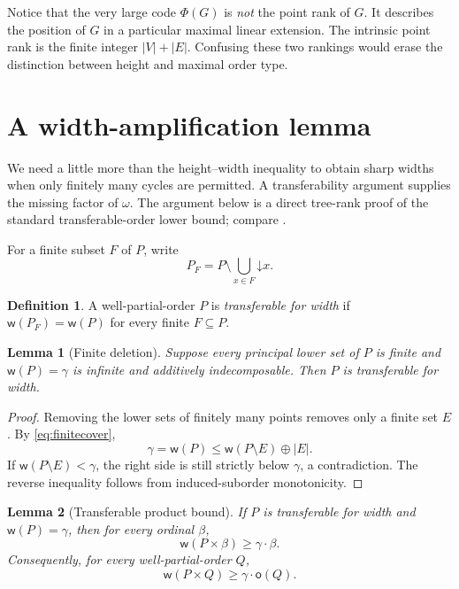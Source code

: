 \documentclass[11pt,letterpaper]{article}
\theoremstyle{plain}
\newtheorem{lemma}[lemma]{Lemma}
\theoremstyle{definition}
\newtheorem{definition}[definition]{Definition}
\theoremstyle{remark}
\newcommand{\mot}{\mathsf o}
\newcommand{\wid}{\mathsf w}
\newcommand{\down}{\mathord\downarrow}
\begin{document}
Notice that the very large code $\Phi(G)$ is \emph{not} the point rank
of $G$. It describes the position of $G$ in a particular maximal
linear extension. The intrinsic point rank is the finite integer
$|V|+|E|$. Confusing these two rankings would erase the distinction
between height and maximal order type.

\section{A width-amplification lemma}\label{sec:transfer}

We need a little more than the height--width inequality to obtain
sharp widths when only finitely many cycles are permitted. A
transferability argument supplies the missing factor of $\omega$.
The argument below is a direct tree-rank proof of the standard
transferable-order lower bound; compare \cite[Section~4.4.2]{DSS}.

For a finite subset $F$ of $P$, write
\[
 P_F=P\setminus\bigcup_{x\in F}\down x.
\]

\begin{definition}
A well-partial-order $P$ is \emph{transferable for width} if
$\wid(P_F)=\wid(P)$ for every finite $F\subseteq P$.
\end{definition}

\begin{lemma}[Finite deletion]\label{lem:finitedeletion}
Suppose every principal lower set of $P$ is finite and
$\wid(P)=\gamma$ is infinite and additively indecomposable. Then $P$
is transferable for width.
\end{lemma}

\begin{proof}
Removing the lower sets of finitely many points removes only a finite
set $E$. By \cref{eq:finitecover},
\[
 \gamma=\wid(P)\le\wid(P\setminus E)\oplus |E|.
\]
If $\wid(P\setminus E)<\gamma$, the right side is still strictly
below $\gamma$, a contradiction. The reverse inequality follows
from induced-suborder monotonicity.
\end{proof}

\begin{lemma}[Transferable product bound]\label{lem:transferbound}
If $P$ is transferable for width and $\wid(P)=\gamma$, then for every
ordinal $\beta$,
\[
 \wid(P\times\beta)\ge\gamma\cdot\beta.
\]
Consequently, for every well-partial-order $Q$,
\[
 \wid(P\times Q)\ge\gamma\cdot\mot(Q).
\]
\end{lemma}
\end{document}
